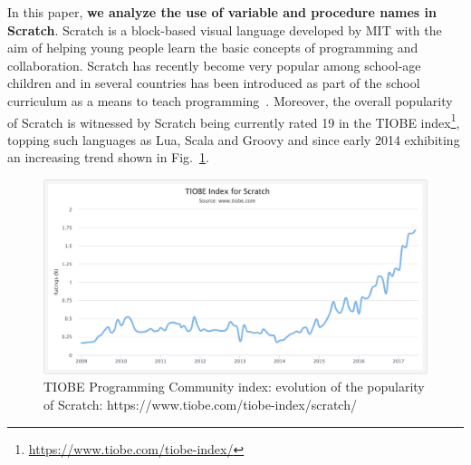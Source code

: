 \documentclass[conference]{IEEEtran}
\newcommand{\todo}[1]{ \textbf{#1} }
\begin{document}
In this paper, \textbf{we analyze the use of variable and procedure names in Scratch}. 
Scratch is a block-based visual language developed by MIT with the aim of helping young people learn the basic concepts of programming and collaboration. 
Scratch has recently become very popular among school-age children and in several countries has been introduced as part of the school curriculum as a means to teach programming~\cite{vanZyl,SaezLopez}.
Moreover, the overall popularity of Scratch is witnessed by Scratch being currently rated 19 in the TIOBE index\footnote{\url{https://www.tiobe.com/tiobe-index/}}, topping such languages as Lua, Scala and Groovy and since early 2014 exhibiting an increasing trend shown in Fig.~\ref{fig:tiobe}.
\begin{figure}
  \begin{center}
  \includegraphics[width=\columnwidth]{fig/tiobe}
  \caption{TIOBE Programming Community index: evolution of the popularity of Scratch: https://www.tiobe.com/tiobe-index/scratch/}
  \label{fig:tiobe}
  \end{center}
\end{figure} 



\end{document}
